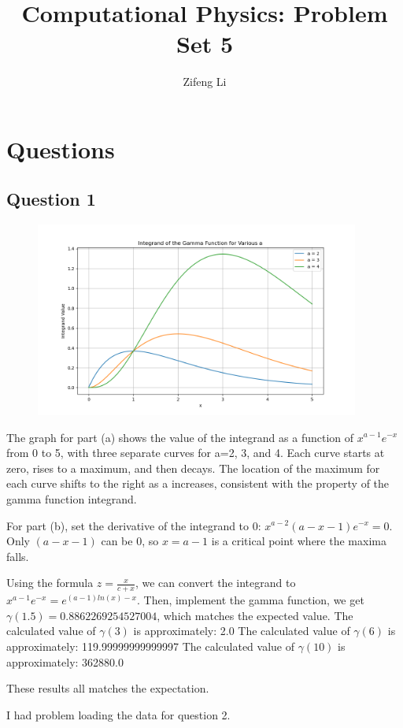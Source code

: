 \documentclass[11pt]{article}
\title{Computational Physics: Problem Set 5}
\author{Zifeng Li}
\begin{document}
\maketitle

\section{Questions}

\subsection{Question 1}
\begin{figure}[b!]
\centering
\includegraphics[width=0.95\textwidth]{Integrand of the Gamma Function for Various a.png}
\end{figure}
The graph for part (a) shows the value of the integrand
as a function of $x^{a-1}e^{-x}$ from 0 to 5, with three separate curves for a=2, 3, and 4. Each curve starts at zero, rises to a maximum, and then decays. The location of the maximum for each curve shifts to the right as a increases, consistent with the property of the gamma function integrand.

For part (b), set the derivative of the integrand to 0: $x^{a-2}(a-x-1)e^{-x} = 0$. Only $(a-x-1)$ can be 0, so $x = a-1$ is a critical point where the maxima falls.

Using the formula $z = \frac{x}{c+x}$, we can convert the integrand to $x^{a-1}e^{-x} = e^{(a-1)ln(x)-x}$. Then, implement the gamma function, we get $\gamma(1.5) = 0.8862269254527004$, which matches the expected value.
The calculated value of $\gamma(3)$ is approximately:  2.0
The calculated value of $\gamma(6)$ is approximately:  119.99999999999997
The calculated value of $\gamma(10)$ is approximately:  362880.0

These results all matches the expectation.

I had problem loading the data for question 2.
\end{document}
